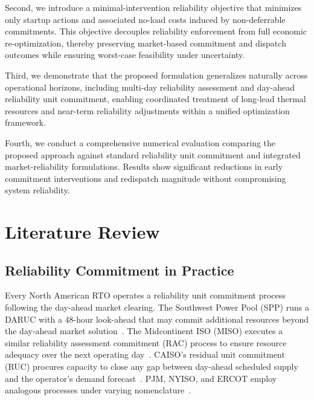 \documentclass[journal]{IEEEtran}
\begin{document}
Second, we introduce a minimal-intervention reliability objective that
minimizes only startup actions and associated no-load costs induced by
non-deferrable commitments. This objective decouples reliability
enforcement from full economic re-optimization, thereby preserving
market-based commitment and dispatch outcomes while ensuring worst-case
feasibility under uncertainty.

Third, we demonstrate that the proposed formulation generalizes
naturally across operational horizons, including multi-day reliability
assessment and day-ahead reliability unit commitment, enabling
coordinated treatment of long-lead thermal resources and near-term
reliability adjustments within a unified optimization framework.

Fourth, we conduct a comprehensive numerical evaluation comparing the
proposed approach against standard reliability unit commitment and
integrated market-reliability formulations. Results show significant
reductions in early commitment interventions and redispatch magnitude
without compromising system reliability.


\section{Literature Review}

\subsection{Reliability Commitment in Practice}

Every North American RTO operates a reliability unit commitment
process following the day-ahead market clearing.
The Southwest Power Pool (SPP) runs a DARUC with a 48-hour
look-ahead that may commit additional resources beyond the
day-ahead market solution~\cite{spp2024protocols}.
The Midcontinent ISO (MISO) executes a similar reliability
assessment commitment (RAC) process to ensure resource adequacy
over the next operating day~\cite{miso2024bpm002}.
CAISO's residual unit commitment (RUC) procures capacity to
close any gap between day-ahead scheduled supply and the
operator's demand forecast~\cite{caiso2024ruc}.
PJM, NYISO, and ERCOT employ analogous processes under varying
nomenclature~\cite{pjm2024manual11, nyiso2024oatt, ercot2024protocols}.
\end{document}
